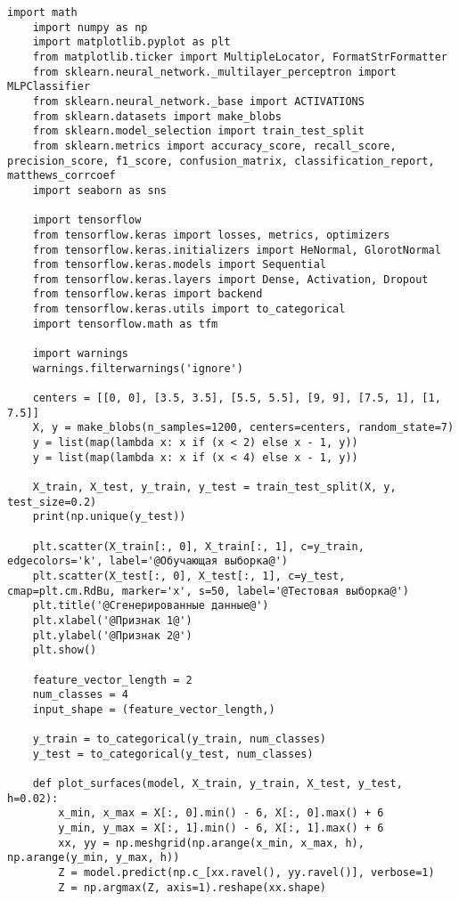 \begin{lstlisting}[label=lst:1,caption=Классификация с использованием нейросетевого подхода]
	import math
	import numpy as np
	import matplotlib.pyplot as plt
	from matplotlib.ticker import MultipleLocator, FormatStrFormatter
	from sklearn.neural_network._multilayer_perceptron import MLPClassifier
	from sklearn.neural_network._base import ACTIVATIONS
	from sklearn.datasets import make_blobs
	from sklearn.model_selection import train_test_split
	from sklearn.metrics import accuracy_score, recall_score, precision_score, f1_score, confusion_matrix, classification_report, matthews_corrcoef
	import seaborn as sns
	
	import tensorflow
	from tensorflow.keras import losses, metrics, optimizers
	from tensorflow.keras.initializers import HeNormal, GlorotNormal
	from tensorflow.keras.models import Sequential
	from tensorflow.keras.layers import Dense, Activation, Dropout
	from tensorflow.keras import backend
	from tensorflow.keras.utils import to_categorical
	import tensorflow.math as tfm
	
	import warnings
	warnings.filterwarnings('ignore')
	
	centers = [[0, 0], [3.5, 3.5], [5.5, 5.5], [9, 9], [7.5, 1], [1, 7.5]]
	X, y = make_blobs(n_samples=1200, centers=centers, random_state=7)
	y = list(map(lambda x: x if (x < 2) else x - 1, y))
	y = list(map(lambda x: x if (x < 4) else x - 1, y))
	
	X_train, X_test, y_train, y_test = train_test_split(X, y, test_size=0.2)
	print(np.unique(y_test))
	
	plt.scatter(X_train[:, 0], X_train[:, 1], c=y_train, edgecolors='k', label='@Обучающая выборка@')
	plt.scatter(X_test[:, 0], X_test[:, 1], c=y_test, cmap=plt.cm.RdBu, marker='x', s=50, label='@Тестовая выборка@')
	plt.title('@Сгенерированные данные@')
	plt.xlabel('@Признак 1@')
	plt.ylabel('@Признак 2@')
	plt.show()
	
	feature_vector_length = 2
	num_classes = 4
	input_shape = (feature_vector_length,)
	
	y_train = to_categorical(y_train, num_classes)
	y_test = to_categorical(y_test, num_classes)
	
	def plot_surfaces(model, X_train, y_train, X_test, y_test, h=0.02):
		x_min, x_max = X[:, 0].min() - 6, X[:, 0].max() + 6
		y_min, y_max = X[:, 1].min() - 6, X[:, 1].max() + 6
		xx, yy = np.meshgrid(np.arange(x_min, x_max, h), np.arange(y_min, y_max, h))
		Z = model.predict(np.c_[xx.ravel(), yy.ravel()], verbose=1)
		Z = np.argmax(Z, axis=1).reshape(xx.shape)
		

\end{lstlisting}
